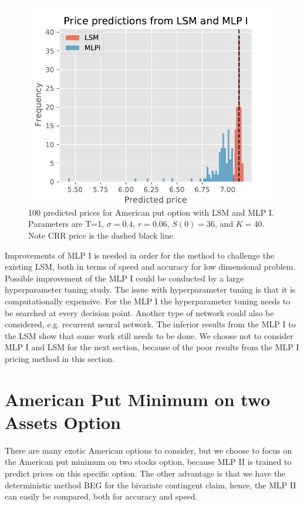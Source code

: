 \begin{figure}[H]
\centering
\includegraphics{Figures/histLSMMLPsI.pdf}
\decoRule
\caption[Histogram Price Predictions]{100 predicted prices for American put option with LSM and MLP I. Parameters are T=1, $\sigma=0.4$, $r=0.06$, $S(0)=36$, and $K=40$. Note CRR price is the dashed black line.}
\label{fig:histLSMMLPI}
\end{figure}

Improvements of MLP I is needed in order for the method to challenge the existing LSM, both in terms of speed and accuracy for low dimensional problem. Possible improvement of the MLP I could be conducted by a large hyperparameter tuning study. The issue with hyperparameter tuning is that it is computationally expensive. For the MLP I the hyperparameter tuning needs to be searched at every decision point. Another type of network could also be considered, e.g. recurrent neural network. The inferior results from the MLP I to the LSM show that some work still needs to be done. We choose not to consider MLP I and LSM for the next section, because of the poor results from the MLP I pricing method in this section.\\
\section{American Put Minimum on two Assets Option}\label{bivariateAmerPut}
There are many exotic American options to consider, but we choose to focus on the American put minimum on two stocks option, because MLP II is trained to predict prices on this specific option. The other advantage is that we have the deterministic method BEG for the bivariate contingent claim, hence, the MLP II can easily be compared, both for accuracy and speed.\\

